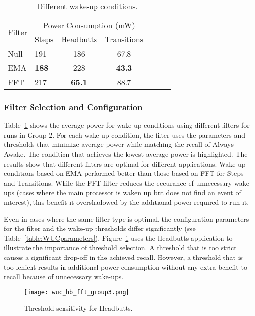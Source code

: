 \begin{table}[t]
\centering
{\small
    \begin{tabular}{|l|l|c|c|c|c|c|}
	\hline
    \multirow{2}{*}{Filter}    	& \multicolumn{3}{c|}{Power Consumption (mW)} \\ \cline{2-4}
							& Steps	& Headbutts	& Transitions 	\\ \hline
    Null     				& 191		& 186		& 67.8 			\\ \hline
	EMA   				& {\bf 188}		& 228		& {\bf 43.3} 			\\ \hline
	FFT 				& 217		& {\bf 65.1} 		& 88.7 			\\ \hline
	
    \end{tabular}
}
	\caption{Different wake-up conditions.}
	\label{table:WUCfilters}
\end{table}

\subsubsection{Filter Selection and Configuration}

Table~\ref{table:WUCfilters} shows the average power for wake-up
conditions using different filters for runs in Group 2.  For each
wake-up condition, the filter uses the parameters and thresholds that
minimize average power while matching the recall of Always Awake.  The
condition that achieves the lowest average power is highlighted.  The
results show that different filters are optimal for different
applications.  Wake-up conditions based on EMA performed better than
those based on FFT for Steps and Transitions.  While the FFT filter
reduces the occurance of unnecessary wake-ups (cases where
the main processor is waken up but does not find an event of
interest), this benefit it overshadowed by the additional power
required to run it.

Even in cases where the same filter type is optimal, the configuration
parameters for the filter and the wake-up thresholds differ
significantly (see Table~\ref{table:WUCparameters}).
Figure~\ref{fig:wucHeadbuttFFTRecallPowerGroup3} uses the Headbutts
application to illustrate the importance of threshold selection.  A
threshold that is too strict causes a significant drop-off in the
achieved recall.  However, a threshold that is too lenient results in
additional power consumption without any extra benefit to recall
because of unnecessary wake-ups.


\begin{figure}[h]
	\texttt{[image: wuc\_hb\_fft\_group3.png]}
	\caption{Threshold sensitivity for Headbutts.}
    \label{fig:wucHeadbuttFFTRecallPowerGroup3}
\end{figure}




